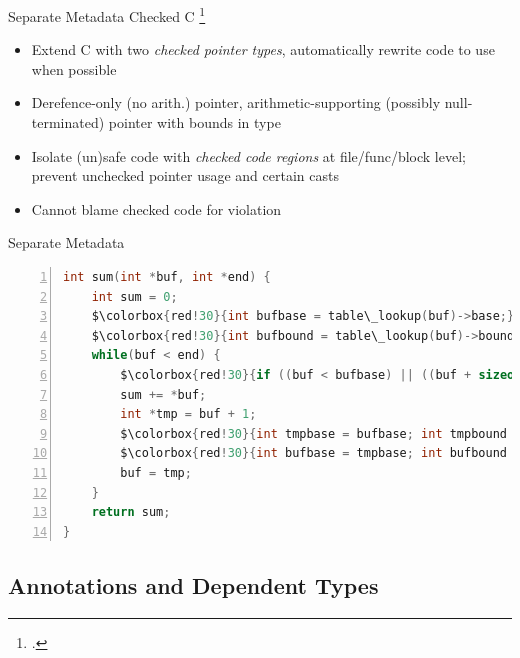 \documentclass[aspectratio=169]{beamer}
\begin{document}
\begin{frame}{Separate Metadata}
Checked C \footcite{ruef_checked_2017}
    \begin{itemize}
        \item Extend C with two \emph{checked pointer types}, automatically rewrite code to use when possible
        \item Derefence-only (no arith.) pointer, arithmetic-supporting (possibly null-terminated) pointer with bounds in type
        \item Isolate (un)safe code with \emph{checked code regions} at file/func/block level; prevent unchecked pointer usage and certain casts
        \item Cannot blame checked code for violation
    \end{itemize}
\end{frame}


\begin{frame}[fragile]{Separate Metadata}
  \footnotesize
  \begin{lstlisting}[language=C,numbers=left,mathescape,basicstyle={\footnotesize\ttfamily}]
int sum(int *buf, int *end) {
    int sum = 0;
    $\colorbox{red!30}{int bufbase = table\_lookup(buf)->base;}$
    $\colorbox{red!30}{int bufbound = table\_lookup(buf)->bound;}$
    while(buf < end) {
        $\colorbox{red!30}{if ((buf < bufbase) || ((buf + sizeof(buf)) > bufbound)) abort;}$
        sum += *buf;
        int *tmp = buf + 1;
        $\colorbox{red!30}{int tmpbase = bufbase; int tmpbound = bufbound;}$ // inherit base and bound
        $\colorbox{red!30}{int bufbase = tmpbase; int bufbound = tmpbound;}$ // would be optimized out
        buf = tmp;
    }
    return sum;
}
  \end{lstlisting}
\end{frame}

\subsection{Annotations and Dependent Types}
\end{document}
